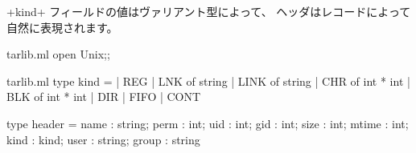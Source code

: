 \ml+kind+ フィールドの値はヴァリアント型によって、 ヘッダはレコードによって自然に表現されます。
%
\begin{codefile}{tarlib.ml}
open Unix;;
\end{codefile}
%
\begin{listingcodefile}{tarlib.ml}
type kind =
  | REG | LNK of string | LINK of string | CHR of int * int
  | BLK of int * int | DIR | FIFO | CONT

type header =
    { name : string; perm : int; uid : int; gid : int; size : int;
      mtime : int; kind : kind; user : string; group : string }
\end{listingcodefile}

